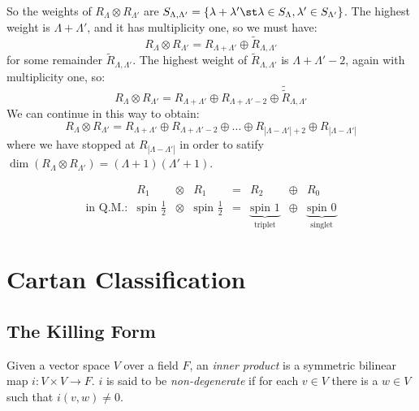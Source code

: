 \documentclass{jknotes}
\begin{document}
So the weights of \(R_\Lambda\otimes R_{\Lambda'}\) are \(S_{\Lambda,\Lambda'} = \{\lambda+\lambda' \st \lambda\in S_\Lambda, \lambda'\in S_{\Lambda'}\}\). The highest weight is \(\Lambda+\Lambda'\), and it has multiplicity one, so we must have:
\begin{equation}
    R_\Lambda \otimes R_{\Lambda'} = R_{\Lambda+\Lambda'} \oplus \tilde{R}_{\Lambda,\Lambda'}
\end{equation}
for some remainder \(\tilde{R}_{\Lambda,\Lambda'}\). The highest weight of \(\tilde{R}_{\Lambda,\Lambda'}\) is \(\Lambda+\Lambda'-2\), again with multiplicity one, so:
\begin{equation}
    R_\Lambda \otimes R_{\Lambda'} = R_{\Lambda+\Lambda'} \oplus R_{\Lambda+\Lambda'-2} \oplus \tilde{\tilde{R}}_{\Lambda,\Lambda'}
\end{equation}
We can continue in this way to obtain:
\begin{equation}
    R_\Lambda \otimes R_{\Lambda'} = R_{\Lambda+\Lambda'} \oplus R_{\Lambda+\Lambda'-2} \oplus \dots \oplus R_{|\Lambda-\Lambda'|+2} \oplus R_{|\Lambda-\Lambda'|}
\end{equation}
where we have stopped at \(R_{|\Lambda-\Lambda'|}\) in order to satify \(\dim(R_\Lambda\otimes R_{\Lambda'}) = (\Lambda+1)(\Lambda'+1)\).
\begin{eg}
    \begin{equation}
        \begin{array}{rccccccc}
            & R_1 & \otimes & R_1 & = & R_2 & \oplus & R_0 \\
            \text{in Q.M.:} & \text{spin }\frac{1}{2} & \otimes & \text{spin }\frac{1}{2} & = & \underbrace{\text{spin } 1}_\text{triplet} & \oplus & \underbrace{\text{spin } 0}_\text{singlet}
        \end{array}
    \end{equation}
\end{eg}

\section{Cartan Classification}

\subsection{The Killing Form}
\begin{defn}
    Given a vector space \(V\) over a field \(F\), an \emph{inner product} is a symmetric bilinear map \(i:V\times V \rightarrow F\). \(i\) is said to be \emph{non-degenerate} if for each \(v \in V\) there is a \(w \in V\) such that \(i(v,w)\ne 0\).
\end{defn}
\end{document}
